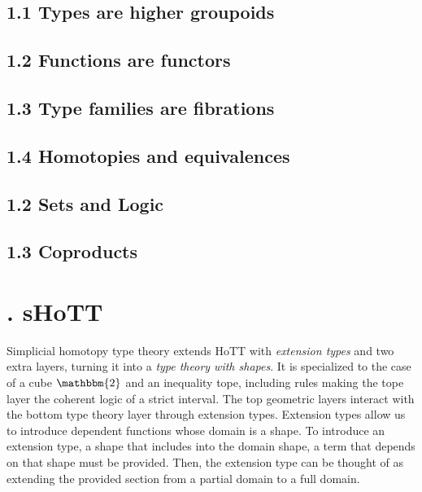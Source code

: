 \documentclass{article}
\theoremstyle{named}
\theoremstyle{remark}
\theoremstyle{definition}
\begin{document}
\setcounter{section}{1}

\subsection*{1.1 Types are higher groupoids}

\subsection*{1.2 Functions are functors}

\subsection*{1.3 Type families are fibrations}



\subsection*{1.4 Homotopies and equivalences}



\subsection*{1.2 Sets and Logic}


\subsection*{1.3 Coproducts}


\newpage

\section*{. sHoTT}
\setcounter{section}{2}
\setcounter{equation}{0}
\setcounter{theorem}{0}

Simplicial homotopy type theory extends HoTT with \textit{extension types} and two extra layers, turning it into a
 \textit{type theory with shapes}. It is specialized to the case of a cube $\mathbbm{2}$ and an inequality tope, including rules making the tope layer the coherent logic of a strict interval. The top geometric layers interact with the bottom type theory layer
 through extension types. Extension types allow us to introduce dependent functions whose domain is a shape. To introduce an extension type, a shape that includes into the domain shape, a term that depends on that shape must be provided. Then, the extension
 type can be thought of as extending the provided section from a partial domain to a full domain. 
\end{document}
